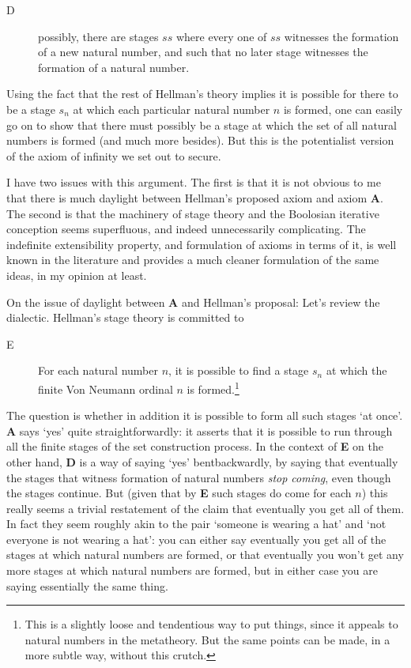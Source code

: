 \documentclass{article}
\theoremstyle{definition}
\begin{document}
\begin{description}
    \item[D] possibly, there are stages $ss$ 
    where every one of $ss$ witnesses the formation of a new natural number, 
    and such that no later stage witnesses the formation of a natural number.
\end{description}

Using the fact that the rest of Hellman's theory implies 
it is possible for there to be a stage $s_n$ at which 
each particular natural number $n$ is formed, 
one can easily go on to show that there must possibly be a stage 
at which the set of all natural numbers is formed (and much more besides). 
But this is the potentialist version of the axiom of infinity we set out to secure.

I have two issues with this argument. 
The first is that it is not obvious to me 
that there is much daylight between Hellman's proposed axiom 
and axiom {\bf A}. The second is that the machinery of stage theory 
and the Boolosian iterative conception seems superfluous, 
and indeed unnecessarily complicating. The indefinite extensibility property,
and formulation of axioms in terms of it, is well known in the literature 
and provides a much cleaner formulation of the same ideas, in my opinion at least.

On the issue of daylight between {\bf A} and Hellman's proposal: 
Let's review the dialectic. Hellman's stage theory is committed to 

\begin{description} 
    \item[E] For each natural number $n$, 
    it is possible to find a stage $s_n$ at which the 
    finite Von Neumann ordinal $n$ is formed.\footnote{
        This is a slightly loose and tendentious way to put things,
        since it appeals to natural numbers in the metatheory. But
        the same points can be made, in a more subtle way, without
        this crutch.
    }
\end{description} 
The question is whether in addition it is possible to form 
all such stages `at once'. {\bf A} says `yes' quite straightforwardly: 
it asserts that it is possible to run through all the finite stages 
of the set construction process. In the context of {\bf E} on the other hand, 
{\bf D} is a way of saying `yes' bentbackwardly, by saying that eventually 
the stages that witness formation of natural numbers \emph{stop coming}, 
even though the stages continue. But (given that by {\bf E} such stages 
do come for each $n$) this really seems a trivial restatement of the 
claim that eventually you get all of them.  In fact they seem roughly akin 
to the pair `someone is wearing a hat' and `not everyone is not wearing a hat': 
you can either say eventually you get all of the stages at which natural numbers 
are formed, or that eventually you won't get any more stages at which natural 
numbers are formed, but in either case you are saying essentially the same thing.
\end{document}
